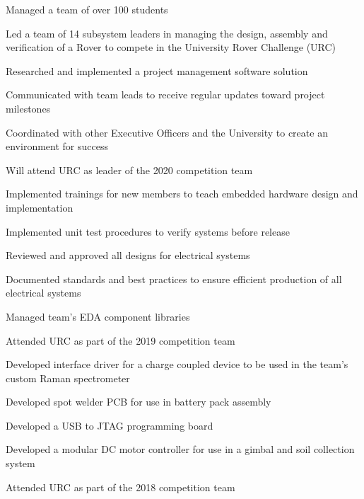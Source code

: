 \documentclass[]{deedy-resume-andrewvanhorn}
\begin{document}
\begin{minipage}[t]{0.66\textwidth}
\begin{tightemize}
	\item Managed a team of over 100 students
	\item Led a team of 14 subsystem leaders in managing the design, assembly and verification of a Rover to compete in the University Rover Challenge (URC)
	\item Researched and implemented a project management software solution
	\item Communicated with team leads to receive regular updates toward project milestones
	\item Coordinated with other Executive Officers and the University to create an environment for success
	\item Will attend URC as leader of the 2020 competition team
\end{tightemize}
\begin{tightemize}
	\item Implemented trainings for new members to teach embedded hardware design and implementation
	\item Implemented unit test procedures to verify systems before release
	\item Reviewed and approved all designs for electrical systems
	\item Documented standards and best practices to ensure efficient production of all electrical systems
	\item Managed team's EDA component libraries
	\item Attended URC as part of the 2019 competition team
\end{tightemize}
\begin{tightemize}
	\item Developed interface driver for a charge coupled device to be used in the team's custom Raman spectrometer
	\item Developed spot welder PCB for use in battery pack assembly
	\item Developed a USB to JTAG programming board
	\item Developed a modular DC motor controller for use in a gimbal and soil collection system
	\item Attended URC as part of the 2018 competition team
\end{tightemize}
\sectionsep


\end{minipage}
\end{document}
